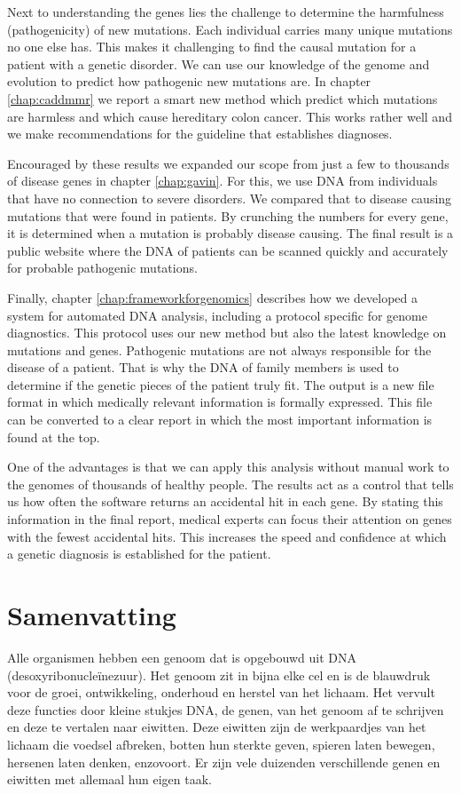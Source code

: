 \begin{appendices}
Next to understanding the genes lies the challenge to determine the harmfulness (pathogenicity) of new mutations.
Each individual carries many unique mutations no one else has.
This makes it challenging to find the causal mutation for a patient with a genetic disorder.
We can use our knowledge of the genome and evolution to predict how pathogenic new mutations are.
In chapter \ref{chap:caddmmr} we report a smart new method which predict which mutations are harmless and which cause hereditary colon cancer.
This works rather well and we make recommendations for the guideline that establishes diagnoses.

Encouraged by these results we expanded our scope from just a few to thousands of disease genes in chapter \ref{chap:gavin}.
For this, we use DNA from individuals that have no connection to severe disorders.
We compared that to disease causing mutations that were found in patients.
By crunching the numbers for every gene, it is determined when a mutation is probably disease causing.
The final result is a public website where the DNA of patients can be scanned quickly and accurately for probable pathogenic mutations.

Finally, chapter \ref{chap:frameworkforgenomics} describes how we developed a system for automated DNA analysis, including a protocol specific for genome diagnostics.
This protocol uses our new method but also the latest knowledge on mutations and genes.
Pathogenic mutations are not always responsible for the disease of a patient.
That is why the DNA of family members is used to determine if the genetic pieces of the patient truly fit.
The output is a new file format in which medically relevant information is formally expressed.
This file can be converted to a clear report in which the most important information is found at the top.

One of the advantages is that we can apply this analysis without manual work to the genomes of thousands of healthy people.
The results act as a control that tells us how often the software returns an accidental hit in each gene.
By stating this information in the final report, medical experts can focus their attention on genes with the fewest accidental hits.
This increases the speed and confidence at which a genetic diagnosis is established for the patient.

\chapter{Samenvatting}
Alle organismen hebben een genoom dat is opgebouwd uit DNA (desoxyribonucleïnezuur).
Het genoom zit in bijna elke cel en is de blauwdruk voor de groei, ontwikkeling, onderhoud en herstel van het lichaam.
Het vervult deze functies door kleine stukjes DNA, de genen, van het genoom af te schrijven en deze te vertalen naar eiwitten.
Deze eiwitten zijn de werkpaardjes van het lichaam die voedsel afbreken, botten hun sterkte geven, spieren laten bewegen, hersenen laten denken, enzovoort.
Er zijn vele duizenden verschillende genen en eiwitten met allemaal hun eigen taak.


\end{appendices}
